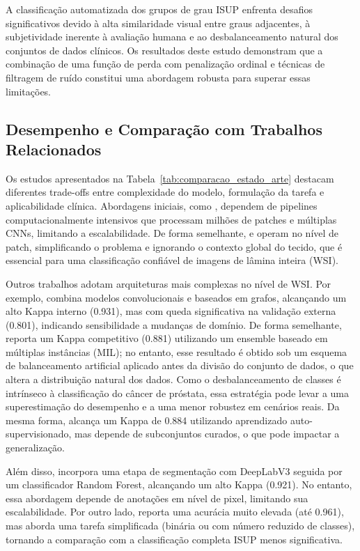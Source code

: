 A classificação automatizada dos grupos de grau ISUP enfrenta desafios significativos devido à alta similaridade visual entre graus adjacentes, à subjetividade inerente à avaliação humana e ao desbalanceamento natural dos conjuntos de dados clínicos. Os resultados deste estudo demonstram que a combinação de uma função de perda com penalização ordinal e técnicas de filtragem de ruído constitui uma abordagem robusta para superar essas limitações.

\subsection{Desempenho e Comparação com Trabalhos Relacionados}

Os estudos apresentados na Tabela~\ref{tab:comparacao_estado_arte} destacam diferentes trade-offs entre complexidade do modelo, formulação da tarefa e aplicabilidade clínica. Abordagens iniciais, como \cite{pyramidalcnn}, dependem de pipelines computacionalmente intensivos que processam milhões de patches e múltiplas CNNs, limitando a escalabilidade. De forma semelhante, \cite{ikromjanov2021vit_prostate} e \cite{kosoko2024xai_prostate} operam no nível de patch, simplificando o problema e ignorando o contexto global do tecido, que é essencial para uma classificação confiável de imagens de lâmina inteira (WSI).

Outros trabalhos adotam arquiteturas mais complexas no nível de WSI. Por exemplo, \cite{Xiang2023Prostate} combina modelos convolucionais e baseados em grafos, alcançando um alto Kappa interno (0.931), mas com queda significativa na validação externa (0.801), indicando sensibilidade a mudanças de domínio. De forma semelhante, \cite{bhattacharyya2024wsi} reporta um Kappa competitivo (0.881) utilizando um ensemble baseado em múltiplas instâncias (MIL); no entanto, esse resultado é obtido sob um esquema de balanceamento artificial aplicado antes da divisão do conjunto de dados, o que altera a distribuição natural dos dados. Como o desbalanceamento de classes é intrínseco à classificação do câncer de próstata, essa estratégia pode levar a uma superestimação do desempenho e a uma menor robustez em cenários reais. Da mesma forma, \cite{bhattacharyya2026tsor} alcança um Kappa de 0.884 utilizando aprendizado auto-supervisionado, mas depende de subconjuntos curados, o que pode impactar a generalização.

Além disso, \cite{kabir2025automating} incorpora uma etapa de segmentação com DeepLabV3 seguida por um classificador Random Forest, alcançando um alto Kappa (0.921). No entanto, essa abordagem depende de anotações em nível de pixel, limitando sua escalabilidade. Por outro lado, \cite{alici2024efficient} reporta uma acurácia muito elevada (até 0.961), mas aborda uma tarefa simplificada (binária ou com número reduzido de classes), tornando a comparação com a classificação completa ISUP menos significativa.

